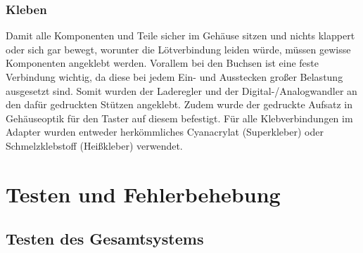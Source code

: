 \documentclass[11pt, twoside]{article}
\begin{document}
\subsubsection{Kleben}
Damit alle Komponenten und Teile sicher im Gehäuse sitzen und nichts klappert oder sich gar bewegt, worunter die Lötverbindung leiden würde, müssen gewisse Komponenten angeklebt werden. Vorallem bei den Buchsen ist eine feste Verbindung wichtig, da diese bei jedem Ein- und Ausstecken großer Belastung ausgesetzt sind. Somit wurden der Laderegler und der Digital-/Analogwandler an den dafür gedruckten Stützen angeklebt. Zudem wurde der gedruckte Aufsatz in Gehäuseoptik für den Taster auf diesem befestigt. Für alle Klebverbindungen im Adapter wurden entweder herkömmliches Cyanacrylat (Superkleber) oder Schmelzklebstoff (Heißkleber) verwendet.

\section{Testen und Fehlerbehebung}
\subsection{Testen des Gesamtsystems}
\end{document}
